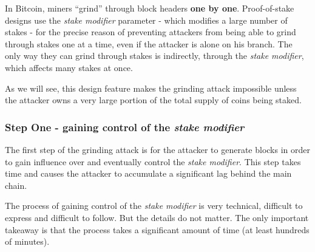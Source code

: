 \documentclass[a4paper,11pt]{article}
\begin{document}
In Bitcoin, miners ``grind'' through block headers \textbf{one by one}. Proof-of-stake designs use the \textit{stake modifier} parameter - which modifies a large number of stakes - for the precise reason of preventing attackers from being able to grind through stakes one at a time, even if the attacker is alone on his branch. The only way they can grind through stakes is indirectly, through the \textit{stake modifier}, which affects many stakes at once.

As we will see, this design feature makes the grinding attack impossible unless the attacker owns a very large portion of the total supply of coins being staked.

\subsubsection*{Step One - gaining control of the \textit{stake modifier}}

The first step of the grinding attack is for the attacker to generate blocks in order to gain influence over and eventually control the \textit{stake modifier}. This step takes time and causes
the attacker to accumulate a significant lag behind the main chain. 

The process of gaining control of the \textit{stake modifier} is very technical, difficult to express and difficult to follow. But the details do not matter. The only important takeaway is that the process takes a significant amount of time (at least hundreds of minutes).
\end{document}
